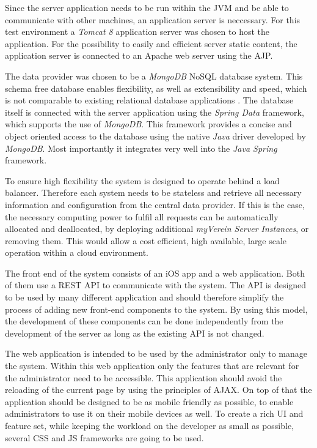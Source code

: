 Since the server application needs to be run within the \gls{JVM} and be able to communicate with other machines, an application server is neccessary. For this test environment a \emph{Tomcat 8} application server was chosen to host the application. For the possibility to easily and efficient server static content, the application server is connected to an Apache web server using the \gls{AJP}. 

The data provider was chosen to be a \emph{MongoDB} \gls{NoSQL} database system. This schema free database enables flexibility, as well as extensibility and speed, which is not comparable to existing relational database applications \cite{Moschetti:2014aa}. The database itself is connected with the server application using the \emph{Spring Data} framework, which supports the use of \emph{MongoDB}. This framework provides a concise and object oriented access to the database using the native \emph{Java} driver developed by \emph{MongoDB}. Most importantly it integrates very well into the \emph{Java Spring} framework.

To ensure high flexibility the system is designed to operate behind a load balancer. Therefore each system needs to be stateless and retrieve all necessary information and configuration from the central data provider. If this is the case, the necessary computing power to fulfil all requests can be automatically allocated and deallocated, by deploying additional \emph{myVerein Server Instances}, or removing them. This would allow a cost efficient, high available, large scale operation within a cloud environment.  

The front end of the system consists of an iOS app and a web application. Both of them use a \gls{REST} \gls{API} to communicate with the system. The \gls{API} is designed to be used by many different application and should therefore simplify the process of adding new front-end components to the system. By using this model, the development of these components can be done independently from the development of the server as long as the existing \gls{API} is not changed.

The web application is intended to be used by the administrator only to manage the system. Within this web application only the features that are relevant for the administrator need to be accessible. This application should avoid the reloading of the current page by using the principles of \gls{AJAX}. On top of that the application should be designed to be as mobile friendly as possible, to enable administrators to use it on their mobile devices as well. To create a rich \gls{UI} and feature set, while keeping the workload on the developer as small as possible, several \gls{CSS} and \gls{JS} frameworks are going to be used.

